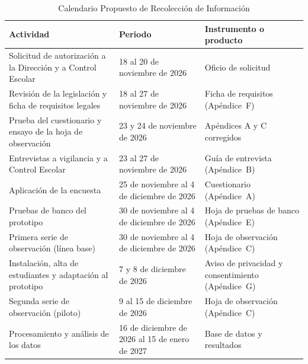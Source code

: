 \begin{table}[tbp]
	\caption{Calendario Propuesto de Recolección de Información}
	\label{tab:calendario-metodo}
	\small\linespread{1}\selectfont
	\begin{tabular}{@{}P{6.2cm}P{4.4cm}P{4.9cm}@{}}
		\toprule
		Actividad                                                             & Periodo                                   & Instrumento o producto                          \\
		\midrule
		Solicitud de autorización a la Dirección y a Control Escolar          & 18 al 20 de noviembre de 2026             & Oficio de solicitud                             \\[0.5em]
		Revisión de la legislación y ficha de requisitos legales             & 18 al 27 de noviembre de 2026             & Ficha de requisitos (Apéndice~F)                \\[0.5em]
		Prueba del cuestionario y ensayo de la hoja de observación            & 23 y 24 de noviembre de 2026              & Apéndices A y C corregidos                      \\[0.5em]
		Entrevistas a vigilancia y a Control Escolar                          & 23 al 27 de noviembre de 2026             & Guía de entrevista (Apéndice~B)                 \\[0.5em]
		Aplicación de la encuesta                                             & 25 de noviembre al 4 de diciembre de 2026 & Cuestionario (Apéndice~A)                       \\[0.5em]
		Pruebas de banco del prototipo                                        & 30 de noviembre al 4 de diciembre de 2026 & Hoja de pruebas de banco (Apéndice~E)          \\[0.5em]
		Primera serie de observación (línea base)                             & 30 de noviembre al 4 de diciembre de 2026 & Hoja de observación (Apéndice~C)                \\[0.5em]
		Instalación, alta de estudiantes y adaptación al prototipo            & 7 y 8 de diciembre de 2026                & Aviso de privacidad y consentimiento (Apéndice~G) \\[0.5em]
		Segunda serie de observación (piloto)                                 & 9 al 15 de diciembre de 2026              & Hoja de observación (Apéndice~C)                \\[0.5em]
		Procesamiento y análisis de los datos                                 & 16 de diciembre de 2026 al 15 de enero de 2027 & Base de datos y resultados                 \\[0.5em]

\end{tabular}
\end{table}
